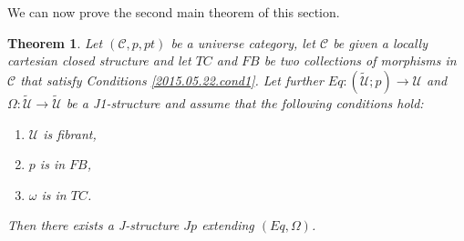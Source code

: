 \documentclass[12pt]{article}
\numberwithin{equation}{section}
\newtheorem{theorem}[proposition]{Theorem}
\newcommand{\llabel}[1]{\label{#1}}
\newcommand{\sr}{\rightarrow}
\newcommand{\wt}{\widetilde}
\newcommand{\C}{{\mathcal C}}  %
\newcommand{\U}{\mathcal{U}}
\begin{document}
%















We can now prove the second main theorem of this section.
%
\begin{theorem}
\llabel{2015.05.16.th1} Let $({\C},p,pt)$ be a universe category, let
$\C$ be given a locally cartesian closed structure and let $TC$ and
$FB$ be two collections of morphisms in $\C$ that satisfy Conditions
\ref{2015.05.22.cond1}. Let further $Eq:(\wt{\U};p)\sr \U$ and $\Omega:\wt{\U}\sr
\wt{\U}$ be a J1-structure and assume that the following conditions hold:
%
\begin{enumerate}
\item $\U$ is fibrant,
\item $p$ is in $FB$,
\item $\omega$ is in $TC$.
\end{enumerate}
%
Then there exists a J-structure $Jp$ extending $(Eq,\Omega)$.
\end{theorem}
%
\end{document}
